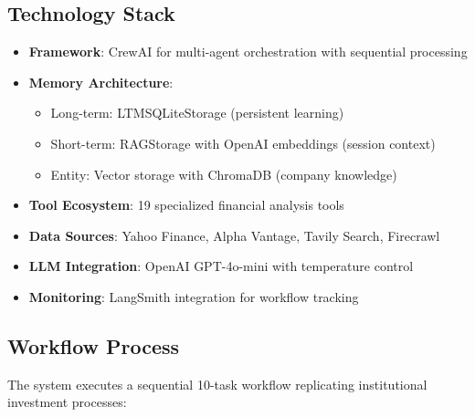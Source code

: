 \documentclass[11pt,a4paper]{article}
\begin{document}
\subsection{Technology Stack}

\begin{itemize}
    \item \textbf{Framework}: CrewAI for multi-agent orchestration with sequential processing
    \item \textbf{Memory Architecture}: 
    \begin{itemize}
        \item Long-term: LTMSQLiteStorage (persistent learning)
        \item Short-term: RAGStorage with OpenAI embeddings (session context)
        \item Entity: Vector storage with ChromaDB (company knowledge)
    \end{itemize}
    \item \textbf{Tool Ecosystem}: 19 specialized financial analysis tools
    \item \textbf{Data Sources}: Yahoo Finance, Alpha Vantage, Tavily Search, Firecrawl
    \item \textbf{LLM Integration}: OpenAI GPT-4o-mini with temperature control
    \item \textbf{Monitoring}: LangSmith integration for workflow tracking
\end{itemize}

\subsection{Workflow Process}

The system executes a sequential 10-task workflow replicating institutional investment processes:
\end{document}
